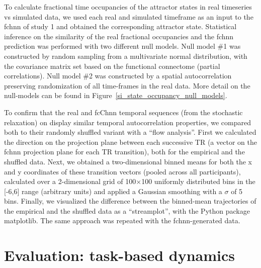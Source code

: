 \documentclass{article}
\begin{document}
To calculate fractional time occupancies of the attractor states in real timeseries vs simulated data, we used each real and simulated timeframe as an input to the \acrshort{fchnn} of study 1 and obtained the corresponding attractor state. Statistical inference on the similarity of the real fractional occupancies and the \acrshort{fchnn} prediction was performed with two different null models. Null model \#1 was constructed  by random sampling from a multivariate normal distribution, with the covariance matrix set based on the functional connectome (partial correlations).
Null model \#2 was constructed by a spatial autocorrelation preserving randomization of all time-frames in the real data. More detail on the null-models can be found in Figure~\ref{si_state_occupancy_null_models}.

To confirm that the real and fcC\acrshort{hnn} temporal sequences (from the stochastic relaxation) on display similar temporal autocorrelation properties, we compared both to their randomly shuffled variant with a ``flow analysis''.
First we calculated the direction on the projection plane between each successive TR (a vector on the \acrshort{fchnn} projection plane for each TR transition), both for the empirical and the shuffled data.
Next, we obtained a two-dimensional binned means for both the x and y coordinates of these transition vectors (pooled across all participants), calculated over a 2-dimensional grid of 100$\times$100 uniformly distributed bins in the [-6,6] range (arbitrary units) and applied a Gaussian smoothing with a $\sigma$ of 5 bins.
Finally, we visualized the difference between the binned-mean trajectories of the empirical and the shuffled data as a ``streamplot'', with the Python package matplotlib.
The same approach was repeated with the \acrshort{fchnn}-generated data.

\section{Evaluation: task-based dynamics}
\end{document}
